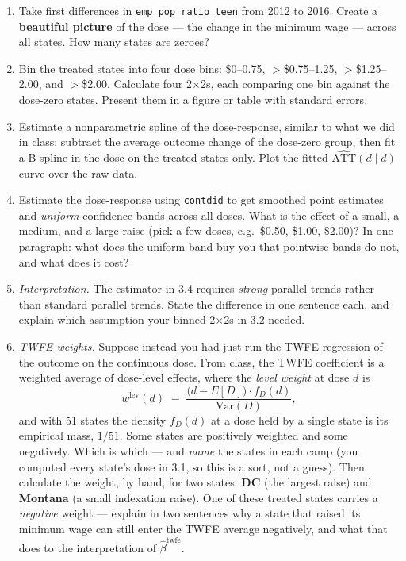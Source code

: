 \documentclass[11pt,a4paper]{article}
\newcommand{\code}[1]{\texttt{\color{ChiantiRed}#1}}
\begin{document}
\begin{enumerate}[label=3.\arabic*., itemsep=4pt, leftmargin=2.2em]
  \item Take first differences in \code{emp\_pop\_ratio\_teen} from 2012 to 2016. Create a \textbf{beautiful picture} of the dose --- the change in the minimum wage --- across all states. How many states are zeroes?
  \item Bin the treated states into four dose bins: \$0--0.75, $>$\$0.75--1.25, $>$\$1.25--2.00, and $>$\$2.00. Calculate four 2$\times$2s, each comparing one bin against the dose-zero states. Present them in a figure or table with standard errors.
  \item Estimate a nonparametric spline of the dose-response, similar to what we did in class: subtract the average outcome change of the dose-zero group, then fit a B-spline in the dose on the treated states only. Plot the fitted $\widehat{\text{ATT}}(d \mid d)$ curve over the raw data.
  \item Estimate the dose-response using \code{contdid} to get smoothed point estimates and \emph{uniform} confidence bands across all doses. What is the effect of a small, a medium, and a large raise (pick a few doses, e.g.\ \$0.50, \$1.00, \$2.00)? In one paragraph: what does the uniform band buy you that pointwise bands do not, and what does it cost?
  \item \emph{Interpretation.} The estimator in 3.4 requires \emph{strong} parallel trends rather than standard parallel trends. State the difference in one sentence each, and explain which assumption your binned 2$\times$2s in 3.2 needed.
  \item \emph{TWFE weights.} Suppose instead you had just run the TWFE regression of the outcome on the continuous dose. From class, the TWFE coefficient is a weighted average of dose-level effects, where the \emph{level weight} at dose $d$ is
  \[
  w^{\text{lev}}(d) \;=\; \frac{\big(d - E[D]\big)\cdot f_D(d)}{\mathrm{Var}(D)},
  \]
  and with 51 states the density $f_D(d)$ at a dose held by a single state is its empirical mass, $1/51$. Some states are positively weighted and some negatively. Which is which --- and \emph{name} the states in each camp (you computed every state's dose in 3.1, so this is a sort, not a guess). Then calculate the weight, by hand, for two states: \textbf{DC} (the largest raise) and \textbf{Montana} (a small indexation raise). One of these treated states carries a \emph{negative} weight --- explain in two sentences why a state that raised its minimum wage can still enter the TWFE average negatively, and what that does to the interpretation of $\hat\beta^{\text{twfe}}$.
\end{enumerate}
\end{document}
